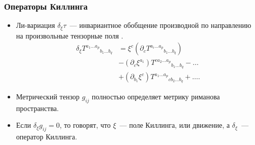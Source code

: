 \documentclass{beamer}
\begin{document}
    \begin{frame}\frametitle{Операторы Киллинга}

        \begin{itemize}

            \item Ли-вариация $\delta_\xi\tau$~--- инвариантное обобщение производной по направлению на произвольные тензорные поля \cite{lie_derivative_theory,symmetry_and_killing_fields}.
            \begin{equation}\begin{aligned}
                \delta_\xi {T^{a_1 \dots a_p}}_{b_1 \dots b_q}
                    &= \xi^c \left( \partial_c {T^{a_i \dots a_p}}_{b_1 \dots b_q} \right) \\
                    &- \left( \partial_{c} \xi^{a_1} \right) {T^{c a_2 \dots a_p}}_{b_1 \dots b_q} - \dots \\
                    &+ \left( \partial_{b_1} \xi^c \right) {T^{a_1 \dots a_p}}_{c b_2 \dots b_q} + \dots .
            \end{aligned}\end{equation}

            \item Метрический тензор $g_{ij}$ полностью определяет метрику риманова пространства.

            \item Если $\delta_\xi g_{ij} = 0$, то говорят, что $\xi$~--- поле Киллинга, или движение, а $\delta_\xi$~--- оператор Киллинга.

        \end{itemize}

    \end{frame}

\end{document}
